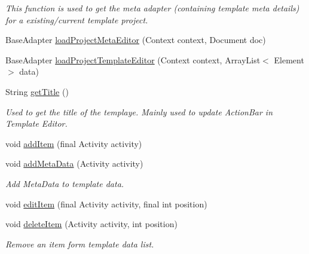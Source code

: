\begin{DoxyCompactItemize}
\begin{DoxyCompactList}\small\item\em This function is used to get the meta adapter (containing template meta details) for a existing/current template project. \end{DoxyCompactList}\item 
Base\+Adapter \hyperlink{classorg_1_1buildmlearn_1_1toolkit_1_1templates_1_1VideoCollectionTemplate_a5087802b25259644746bca10e4e3cf0d}{load\+Project\+Meta\+Editor} (Context context, Document doc)
\item 
Base\+Adapter \hyperlink{classorg_1_1buildmlearn_1_1toolkit_1_1templates_1_1VideoCollectionTemplate_ae1a81f419b99cded3ac3df8e33995584}{load\+Project\+Template\+Editor} (Context context, Array\+List$<$ Element $>$ data)
\item 
String \hyperlink{classorg_1_1buildmlearn_1_1toolkit_1_1templates_1_1VideoCollectionTemplate_a1cc61780e34f230e16af317a2481aa62}{get\+Title} ()
\begin{DoxyCompactList}\small\item\em Used to get the title of the templaye. Mainly used to update Action\+Bar in Template Editor. \end{DoxyCompactList}\item 
void \hyperlink{classorg_1_1buildmlearn_1_1toolkit_1_1templates_1_1VideoCollectionTemplate_a46be3a90db598a917655d705825df6cc}{add\+Item} (final Activity activity)
\item 
void \hyperlink{classorg_1_1buildmlearn_1_1toolkit_1_1templates_1_1VideoCollectionTemplate_a93cea63f053ffef0896fc560b7fe943a}{add\+Meta\+Data} (Activity activity)
\begin{DoxyCompactList}\small\item\em Add Meta\+Data to template data. \end{DoxyCompactList}\item 
void \hyperlink{classorg_1_1buildmlearn_1_1toolkit_1_1templates_1_1VideoCollectionTemplate_a5886244a2336ce1892b8d9d9c40b4312}{edit\+Item} (final Activity activity, final int position)
\item 
void \hyperlink{classorg_1_1buildmlearn_1_1toolkit_1_1templates_1_1VideoCollectionTemplate_a2ee7af71ccb38fbe2312f8d42315fbcf}{delete\+Item} (Activity activity, int position)
\begin{DoxyCompactList}\small\item\em Remove an item form template data list. \end{DoxyCompactList}\item 

\end{DoxyCompactItemize}
